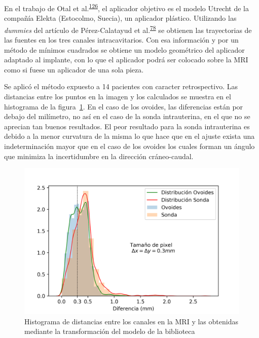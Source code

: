 \documentclass[
  a4paper,
]{scrreprt}
\begin{document}
En el trabajo de Otal et
al.\textsuperscript{\protect\hyperlink{ref-otal2019_plastic}{126}}, el
aplicador objetivo es el modelo Utrecht de la compañía Elekta
(Estocolmo, Suecia), un aplicador plástico. Utilizando las
\emph{dummies} del artículo de Pérez-Calatayud et
al.\textsuperscript{\protect\hyperlink{ref-perez-calatayud2009}{78}} se
obtienen las trayectorias de las fuentes en los tres canales
intracavitarios. Con esa información y por un método de mínimos
cuadrados se obtiene un modelo geométrico del aplicador adaptado al
implante, con lo que el aplicador podrá ser colocado sobre la MRI como
si fuese un aplicador de una sola pieza.

Se aplicó el método expuesto a 14 pacientes con caracter retrospectivo.
Las distancias entre los puntos en la imagen y los calculados se muestra
en el histograma de la figura~\ref{fig-utrecht1}. En el caso de los
ovoides, las diferencias están por debajo del milímetro, no así en el
caso de la sonda intrauterina, en el que no se aprecian tan buenos
resultados. El peor resultado para la sonda intrauterina es debido a la
menor curvatura de la misma lo que hace que en el ajuste exista una
indeterminación mayor que en el caso de los ovoides los cuales forman un
ángulo que minimiza la incertidumbre en la dirección cráneo-caudal.

\begin{figure}

{\centering \includegraphics{img/utrecht1.png}

}

\caption{\label{fig-utrecht1}Histograma de distancias entre los canales
en la MRI y las obtenidas mediante la transformación del modelo de la
biblioteca}

\end{figure}
\end{document}
